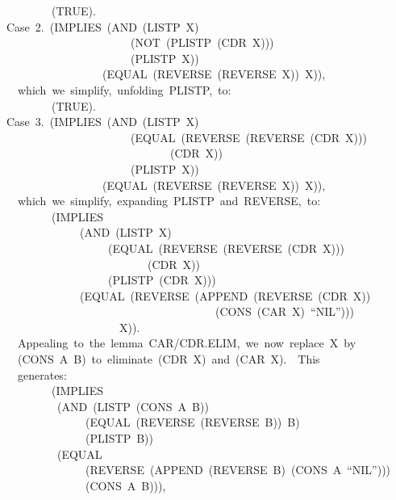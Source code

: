 \documentclass[11pt]{book}
\newenvironment{pubasis}{\begin{flushleft}\ttfamily\small}{\normalsize\rmfamily\end{flushleft}}
\begin{document}
\begin{pubasis}
~~~~~~~~(TRUE).\\

Case~2.~(IMPLIES~(AND~(LISTP~X)\\
~~~~~~~~~~~~~~~~~~~~~~(NOT~(PLISTP~(CDR~X)))\\
~~~~~~~~~~~~~~~~~~~~~~(PLISTP~X))\\
~~~~~~~~~~~~~~~~~(EQUAL~(REVERSE~(REVERSE~X))~X)),\\

~~which~we~simplify,~unfolding~PLISTP,~to:\\

~~~~~~~~(TRUE).\\

Case~3.~(IMPLIES~(AND~(LISTP~X)\\
~~~~~~~~~~~~~~~~~~~~~~(EQUAL~(REVERSE~(REVERSE~(CDR~X)))\\
~~~~~~~~~~~~~~~~~~~~~~~~~~~~~(CDR~X))\\
~~~~~~~~~~~~~~~~~~~~~~(PLISTP~X))\\
~~~~~~~~~~~~~~~~~(EQUAL~(REVERSE~(REVERSE~X))~X)),\\

~~which~we~simplify,~expanding~PLISTP~and~REVERSE,~to:\\

~~~~~~~~(IMPLIES\\
~~~~~~~~~~~~~(AND~(LISTP~X)\\
~~~~~~~~~~~~~~~~~~(EQUAL~(REVERSE~(REVERSE~(CDR~X)))\\
~~~~~~~~~~~~~~~~~~~~~~~~~(CDR~X))\\
~~~~~~~~~~~~~~~~~~(PLISTP~(CDR~X)))\\
~~~~~~~~~~~~~(EQUAL~(REVERSE~(APPEND~(REVERSE~(CDR~X))\\
~~~~~~~~~~~~~~~~~~~~~~~~~~~~~~~~~~~~~(CONS~(CAR~X)~``NIL'')))\\
~~~~~~~~~~~~~~~~~~~~X)).\\

~~Appealing~to~the~lemma~CAR/CDR.ELIM,~we~now~replace~X~by\\
~~(CONS~A~B)~to~eliminate~(CDR~X)~and~(CAR~X).~~This\\
~~generates:\\

~~~~~~~~(IMPLIES\\
~~~~~~~~~(AND~(LISTP~(CONS~A~B))\\
~~~~~~~~~~~~~~(EQUAL~(REVERSE~(REVERSE~B))~B)\\
~~~~~~~~~~~~~~(PLISTP~B))\\
~~~~~~~~~(EQUAL\\
~~~~~~~~~~~~~~(REVERSE~(APPEND~(REVERSE~B)~(CONS~A~``NIL'')))\\
~~~~~~~~~~~~~~(CONS~A~B))),\\


\end{pubasis}
\end{document}
